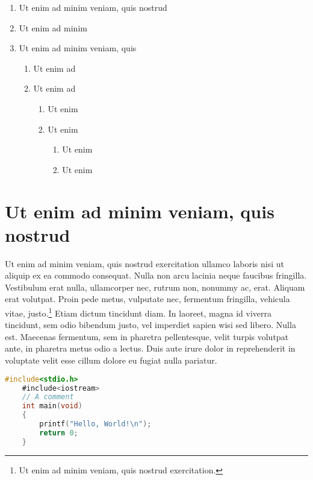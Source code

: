 \begin{enumerate}
    \item Ut enim ad minim veniam, quis nostrud
    \item Ut enim ad minim
    \item Ut enim ad minim veniam, quis
          \begin{enumerate}
              \item Ut enim ad
              \item Ut enim ad
                    \begin{enumerate}
                        \item Ut enim
                        \item Ut enim
                              \begin{enumerate}
                                  \item Ut enim
                                  \item Ut enim
                              \end{enumerate}
                    \end{enumerate}
          \end{enumerate}
\end{enumerate}


\section{Ut enim ad minim veniam, quis nostrud}

Ut enim ad minim veniam, quis nostrud exercitation ullamco laboris nisi ut aliquip ex ea commodo consequat. Nulla non arcu lacinia neque faucibus fringilla. Vestibulum erat nulla, ullamcorper nec, rutrum non, nonummy ac, erat. Aliquam erat volutpat. Proin pede metus, vulputate nec, fermentum fringilla, vehicula vitae, justo.\footnote{Ut enim ad minim veniam, quis nostrud exercitation.} Etiam dictum tincidunt diam. In laoreet, magna id viverra tincidunt, sem odio bibendum justo, vel imperdiet sapien wisi sed libero. Nulla est. Maecenas fermentum, sem in pharetra pellentesque, velit turpis volutpat ante, in pharetra metus odio a lectus. Duis aute irure dolor in reprehenderit in voluptate velit esse cillum dolore eu fugiat nulla pariatur.

\begin{lstlisting}[caption={~Zbytečný kód},label=list:8-6,captionpos=t,float,abovecaptionskip=-\medskipamount,belowcaptionskip=\medskipamount,language=C]
    #include<stdio.h>
    #include<iostream>
    // A comment
    int main(void)
    {
        printf("Hello, World!\n");
        return 0;
    }
\end{lstlisting}

